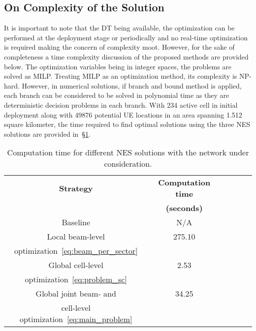 \subsection{On Complexity of the Solution}
It is important to note that the DT being available, the optimization can be performed at the deployment stage or periodically and no real-time optimization is required making the concern of complexity moot. However, for the sake of completeness a time complexity discussion of the proposed methods are provided below.
The optimization variables being in integer spaces, the problems are solved as MILP. Treating MILP as an optimization method, its complexity is NP-hard. However, in numerical solutions, if branch and bound method is applied, each branch can be considered to be solved in polynomial time as they are deterministic decision problems in each branch.
With 234 active cell in initial deployment along with 49876 potential UE locations in an area spanning 1.512 square kilometer, the time required to find optimal solutions using the three NES solutions are provided in~\S\ref{tab:results}.


\begin{table}[]
\begin{center}
\vspace{10pt}
\begin{tabular}{|c|c|c|c|c|c|}
\cline{1-2} 
\textbf{Strategy} &\textbf{Computation time}\\ 
 &\textbf{(seconds)}\\ \cline{1-2} 
Baseline   & N/A  \\ \cline{1-2}  
Local beam-level        & 275.10  \\ 
optimization~\eqref{eq:beam_per_sector}         &\\ \cline{1-2}
Global cell-level        & 2.53 \\ 
optimization~\eqref{eq:problem_sc}          & \\ \cline{1-2}
Global joint beam- and     & 34.25 \\ 
cell-level optimization~\eqref{eq:main_problem}       &\\ \cline{1-2}
\end{tabular} 
\vspace{5pt}
\caption{Computation time for different NES solutions with the network under consideration.}
\label{tab:results}
\end{center}
\vspace{-10pt}
\end{table}
\vspace{-5pt}